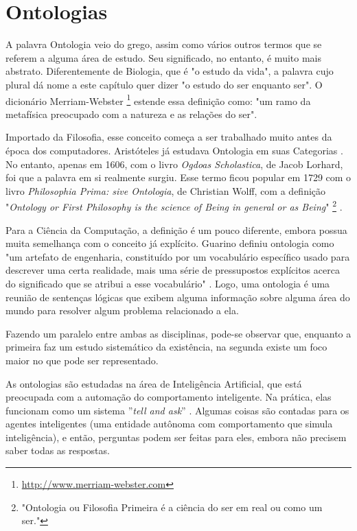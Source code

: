 \chapter{Ontologias}
\label{chap:ontologias}

\lettrine{A}{} palavra Ontologia veio do grego, assim como vários outros termos que se referem a alguma área de estudo. Seu significado, no entanto, é muito mais abstrato. Diferentemente de Biologia, que é "o estudo da vida", a palavra cujo plural dá nome a este capítulo quer dizer "o estudo do ser enquanto ser". O dicionário Merriam-Webster \footnote{\url{http://www.merriam-webster.com}} estende essa definição como: "um ramo da metafísica preocupado com a natureza e as relações do ser".

Importado da Filosofia, esse conceito começa a ser trabalhado muito antes da época dos computadores. Aristóteles já estudava Ontologia em suas Categorias \citep{ontoDahlberg}. No entanto, apenas em 1606, com o livro \textit{Ogdoas Scholastica}, de Jacob Lorhard, foi que a palavra em si realmente surgiu. Esse termo ficou popular em 1729 com o livro \textit{Philosophia Prima: sive Ontologia}, de Christian Wolff, com a definição "\textit{Ontology or First Philosophy is the science of Being in general or as Being}" \footnote{"Ontologia ou Filosofia Primeira é a ciência do ser em real ou como um ser."}  \citep{ontoNickles}.

Para a Ciência da Computação, a definição é um pouco diferente, embora possua muita semelhança com o conceito já explícito. Guarino definiu ontologia como "um artefato de engenharia, constituído por um vocabulário específico usado para descrever uma certa realidade, mais uma série de pressupostos explícitos acerca do significado que se atribui a esse vocabulário" \citep{ontoGuarino}. Logo, uma ontologia é uma reunião de sentenças lógicas que exibem alguma informação sobre alguma área do mundo para resolver algum problema relacionado a ela.

Fazendo um paralelo entre ambas as disciplinas, pode-se observar que, enquanto a primeira faz um estudo sistemático da existência, na segunda existe um foco maior no que pode ser representado.

As ontologias são estudadas na área de Inteligência Artificial, que está preocupada com a automação do comportamento inteligente. Na prática, elas funcionam como um sistema ''\textit{tell and ask}'' \citep{ontoRussel}. Algumas coisas são contadas para os agentes inteligentes (uma entidade autônoma com comportamento que simula inteligência), e então, perguntas podem ser feitas para eles, embora não precisem saber todas as respostas. 

